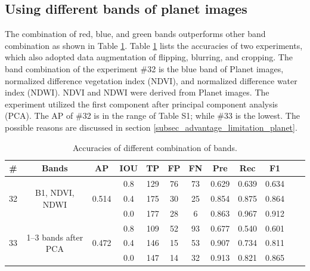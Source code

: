 \documentclass[preprint,12pt,authoryear]{elsarticle}
\begin{document}
\subsection{Using different bands of planet images}
\label{subsub_otherbands}

The combination of red, blue, and green bands outperforms other band combination as shown in Table \ref{table_acc_otherbands}. Table \ref{table_acc_otherbands} lists the accuracies of two experiments, which also adopted data augmentation of flipping, blurring, and cropping. The band combination of the experiment \#32 is the blue band of Planet images, normalized difference vegetation index (NDVI), and normalized difference water index (NDWI).  NDVI and NDWI were derived from Planet images. The experiment utilized the first component after principal component analysis (PCA). The AP of \#32 is in the range of Table S1; while \#33 is the lowest. The possible reasons are discussed in section \ref{subsec_advantage_limitation_planet}.

\begin{table}[ht]
\footnotesize
\caption{Accuracies of different combination of bands.}
\label{table_acc_otherbands}
\begin{tabular}{c c c c  c ccc c c c c}
\toprule
\textbf{\#}&\textbf{Bands}&\textbf{AP}&\textbf{IOU}&\textbf{TP}&\textbf{FP}&\textbf{FN}&\textbf{Pre}&\textbf{Rec}&\textbf{F1}\\
\midrule

\multirow{3}{*}{32} &  \multirow{3}{*}{B1, NDVI, NDWI} & \multirow{3}{*}{0.514}  &0.8&129&76&73&0.629 &0.639 &0.634   \\
 &  &  &0.4&175&30&25&0.854 &0.875 &0.864  \\
 &  &  &0.0&177&28&6&0.863 &0.967 &0.912   \\

\multirow{3}{*}{33} &  \multirow{3}{*}{1--3 bands after PCA} & \multirow{3}{*}{0.472} &0.8&109&52&93&0.677 &0.540 &0.601  \\
 &  &  &0.4&146&15&53&0.907 &0.734 &0.811  \\
 &  & &0.0&147&14&32&0.913 &0.821 &0.865  \\

\bottomrule
\end{tabular}
\end{table}
\end{document}
